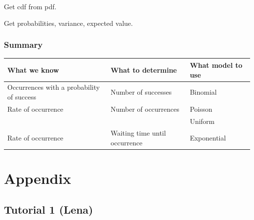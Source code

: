 \documentclass{article}
\renewcommand\appendix{\par
  \setcounter{section}{0}
  \setcounter{subsection}{0}
  \setcounter{figure}{0}
  \setcounter{table}{0}
  \renewcommand\thesection{Appendix \Alph{section}}
  \renewcommand\thefigure{\Alph{section}\arabic{figure}}
  \renewcommand\thetable{\Alph{section}\arabic{table}}
}
\begin{document}
Get cdf from pdf. 

Get probabilities, variance, expected value. 





















\subsubsection{Summary}

\begin{table}[H]
\centering
\small
\begin{tabular}{lll}
\toprule
 \textbf{What we know} & \textbf{What to determine} & \textbf{What model to use} \\
 \midrule
 Occurrences with a probability of success & Number of successes & Binomial \\
  Rate of occurrence & Number of occurrences & Poisson \\
   &  & Uniform \\

  Rate of occurrence  & Waiting time until occurrence & Exponential \\

  \bottomrule
\end{tabular}
\end{table}






\newpage









\newpage

 
\pagebreak


\appendix
\onehalfspacing
\section*{Appendix}
\renewcommand{\thesubsection}{\Alph{subsection}}


\subsection{Tutorial 1 (Lena)}
\end{document}
